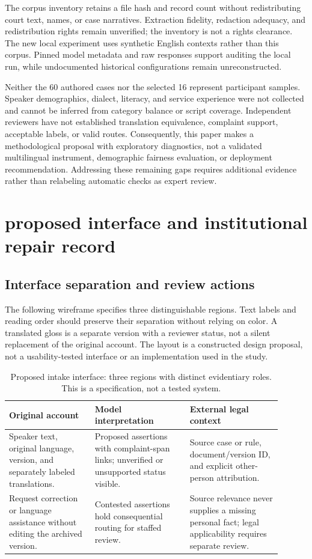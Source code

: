 \documentclass[manuscript,screen,review,anonymous]{acmart}
\begin{document}
The corpus inventory retains a file hash and record count without redistributing court text, names, or case narratives. Extraction fidelity, redaction adequacy, and redistribution rights remain unverified; the inventory is not a rights clearance. The new local experiment uses synthetic English contexts rather than this corpus. Pinned model metadata and raw responses support auditing the local run, while undocumented historical configurations remain unreconstructed.

Neither the 60 authored cases nor the selected 16 represent participant samples. Speaker demographics, dialect, literacy, and service experience were not collected and cannot be inferred from category balance or script coverage. Independent reviewers have not established translation equivalence, complaint support, acceptable labels, or valid routes. Consequently, this paper makes a methodological proposal with exploratory diagnostics, not a validated multilingual instrument, demographic fairness evaluation, or deployment recommendation. Addressing these remaining gaps requires additional evidence rather than relabeling automatic checks as expert review.

\clearpage
\section{proposed interface and institutional repair record}

\subsection{Interface separation and review actions}

The following wireframe specifies three distinguishable regions. Text labels and reading order should preserve their separation without relying on color. A translated gloss is a separate version with a reviewer status, not a silent replacement of the original account. The layout is a constructed design proposal, not a usability-tested interface or an implementation used in the study.
\begin{table}[htbp]
\caption{Proposed intake interface: three regions with distinct evidentiary roles. This is a specification, not a tested system.}
\label{tab:interface}
\centering
\begin{tabular}{@{}p{0.29\linewidth}p{0.31\linewidth}p{0.3\linewidth}@{}}
\toprule
Original account & Model interpretation & External legal context \\
\midrule
Speaker text, original language, version, and separately labeled translations. & Proposed assertions with complaint-span links; unverified or unsupported status visible. & Source case or rule, document/version ID, and explicit other-person attribution. \\
Request correction or language assistance without editing the archived version. & Contested assertions hold consequential routing for staffed review. & Source relevance never supplies a missing personal fact; legal applicability requires separate review. \\
\bottomrule
\end{tabular}
\end{table}
\end{document}
